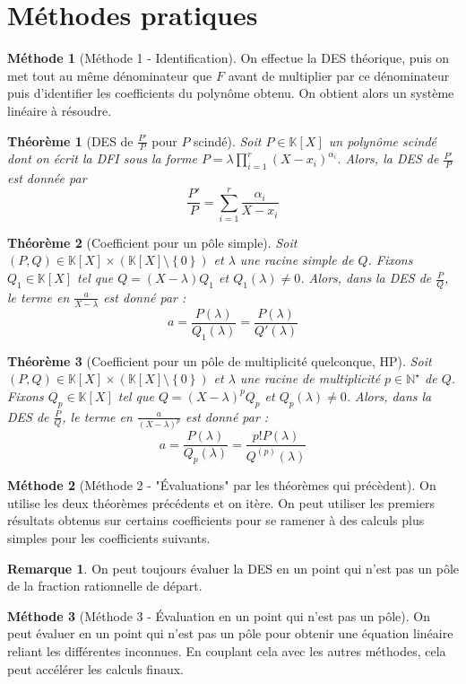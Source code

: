 \documentclass[french]{book}
\newcommand{\N}{\mathbb{N}}
\newcommand{\K}{\mathbb{K}}
\newcommand{\st}{^\star}
\theoremstyle{plain}
\newtheorem{thm}{Théorème}[chapter]
\theoremstyle{definition}
\newtheorem{rmq}{Remarque}[chapter]
\newtheorem{met}{Méthode}[chapter]
\theoremstyle{remark}
\begin{document}
\section{Méthodes pratiques}
\begin{met}[Méthode 1 - Identification]
	On effectue la DES théorique, puis on met tout au même dénominateur que $F$ avant de multiplier par ce dénominateur puis d'identifier les coefficients du polynôme obtenu. On obtient alors un système linéaire à résoudre.
\end{met}
\begin{thm}[DES de $\displaystyle \frac{P'}{P}$ pour $P$ scindé]
	Soit $P\in\K[X]$ un polynôme scindé dont on écrit la DFI sous la forme $\displaystyle P=\lambda\prod_{i=1}^{r}(X-x_i)^{\alpha_i}$. Alors, la DES de $\displaystyle \frac{P'}{P}$ est donnée par $$\frac{P'}{P}=\sum_{i=1}^{r}\frac{\alpha_i}{X-x_i}$$
\end{thm}
\begin{thm}[Coefficient pour un pôle simple]
	Soit $(P,Q)\in\K[X]\times(\K[X]\setminus\left\{0\right\})$ et $\lambda$ une racine simple de $Q$. Fixons $Q_1\in\K[X]$ tel que $Q=(X-\lambda)Q_1$ et $Q_1(\lambda)\ne 0$. Alors, dans la DES de $\displaystyle\frac{P}{Q}$, le terme en $\displaystyle\frac{a}{X-\lambda}$ est donné par : $$a=\frac{P(\lambda)}{Q_1(\lambda)}=\frac{P(\lambda)}{Q'(\lambda)}$$
\end{thm}
\begin{thm}[Coefficient pour un pôle de multiplicité quelconque, HP]
	Soit $(P,Q)\in\K[X]\times(\K[X]\setminus\left\{0\right\})$ et $\lambda$ une racine de multiplicité $p\in\N\st$ de $Q$. Fixons $Q_p\in\K[X]$ tel que $Q=(X-\lambda)^pQ_p$ et $Q_p(\lambda)\ne 0$. Alors, dans la DES de $\displaystyle\frac{P}{Q}$, le terme en $\displaystyle\frac{a}{(X-\lambda)^p}$ est donné par : $$a=\frac{P(\lambda)}{Q_p(\lambda)}=\frac{p!P(\lambda)}{Q^{(p)}(\lambda)}$$
\end{thm}
\begin{met}[Méthode 2 - "Évaluations" par les théorèmes qui précèdent]
	On utilise les deux théorèmes précédents et on itère. On peut utiliser les premiers résultats obtenus sur certains coefficients pour se ramener à des calculs plus simples pour les coefficients suivants.
\end{met}
\begin{rmq} On peut toujours évaluer la DES en un point qui n'est pas un pôle de la fraction rationnelle de départ. \end{rmq}
\begin{met}[Méthode 3 - Évaluation en un point qui n'est pas un pôle]
	On peut évaluer en un point qui n'est pas un pôle pour obtenir une équation linéaire reliant les différentes inconnues. En couplant cela avec les autres méthodes, cela peut accélérer les calculs finaux.
\end{met}
\end{document}
